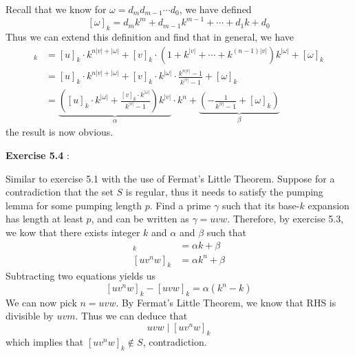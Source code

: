 \documentclass{article}
\newenvironment{solution}[1][\proofname]{
    \proof[\textbf{Solution:}] \renewcommand{\qedsymbol}{$\bell$}
}{\endproof}
\begin{document}
\begin{solution}


    Recall that we know for $\omega = d_m d_{m-1} \cdots d_0$, we have defined 
    \[ [\omega]_k = d_m k^m + d_{m-1} k^{m-1} + \cdots + d_1 k + d_0 \]
    Thus we can extend this definition and find that in general, we have 
    \begin{align*}
        [u v^n \omega]_k 
        & = [u]_k \cdot k^{n|v| + |\omega|} + [v]_k \cdot (1 + k^{|v|} + \cdots + k^{(n-1)|v|}) k^{|\omega|} + [\omega]_k \\ 
        & = [u]_k \cdot k^{n|v| + |\omega|} + [v]_k \cdot k^{|\omega|} \cdot \frac{k^{n|v|} - 1}{k^{|v|} - 1} + [\omega]_k \\ 
        & = \underbrace{ \left( [u]_k \cdot k^{|\omega|} + \frac{[v]_k \cdot k^{|\omega|}}{k^{|v|} - 1} \right) k^{|v|} }_{\alpha} \cdot k^{n} + \underbrace{ \left( - \frac{1}{k^{|v|} - 1} + [\omega]_k \right) }_{\beta} 
    \end{align*}
    the result is now obvious. 
\end{solution}

\noindent \textbf{Exercise 5.4} \label{exercise5.4}: 

\begin{solution}
    Similar to exercise 5.1 with the use of Fermat's Little Theorem. Suppose for a contradiction that the set $S$ is regular, thus it needs to satisfy the pumping lemma for some pumping length $p$. Find a prime $\gamma$ such that its base-$k$ expansion has length at least $p$, and can be written as $\gamma = uvw$. Therefore, by exercise 5.3, we kow that there exists integer $k$ and $\alpha$ and $\beta$ such that
    \begin{align*}
        [uvw]_k & = \alpha k + \beta \\ 
        [uv^nw]_k & = \alpha k^n + \beta 
    \end{align*} 
    Subtracting two equations yields us
    \[ [uv^nw]_k - [uvw]_k = \alpha ( k^n - k )  \]
    We can now pick $n = uvw$. By Fermat's Little Theorem, we know that RHS is divisible by $uvm$. Thus we can deduce that 
    \[ uvw \;|\; [uv^nw]_k \]
    which implies that $[uv^nw]_k \notin S$, contradiction. 
\end{solution}
\end{document}
